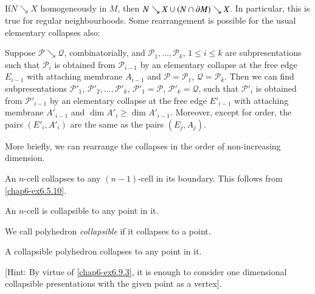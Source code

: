 \subsection{}\label{chap6-sec6.9.2}
If\pageoriginale $N\searrow X$ homogeneously in $M$, then $N\searrow X\cup (N\cap \partial M)\searrow X$. In particular, this is true for regular neighbourhoods. Some rearrangement is possible for the usual elementary collapses also:

\setcounter{proposition}{2}
\begin{ex}\label{chap6-ex6.9.3}
Suppose $\mathscr{P}\searrow \mathcal{Q}$, combinatorially, and $\mathscr{P}_{1},\ldots,\mathscr{P}_{k}$, $1\leq i\leq k$ are subpresentations such that $\mathscr{P}_{i}$ is obtained from $\mathscr{P}_{i-1}$ by an elementary collapse at the free edge $E_{i-1}$ with attaching membrane $A_{i-1}$ and $\mathscr{P}=\mathscr{P}_{1}$, $\mathcal{Q}=\mathscr{P}_{k}$. Then we can find subpresentations $\mathscr{P}'_{1}$, $\mathscr{P}'_{2},\ldots,\mathscr{P}'_{k}$, $\mathscr{P}'_{1}=\mathscr{P}$, $\mathscr{P}'_{k}=\mathcal{Q}$, such that $\mathscr{P}'_{i}$ is obtained from $\mathscr{P}'_{i-1}$ by an elementary collapse at the free edge $E'_{i-1}$ with attaching membrane $A'_{i-1}$ and $\dim A'_{i}\geq \dim A'_{i-1}$. Moreover, except for order, the pairs $(E'_{i},A'_{i})$ are the same as the pairs $(E_{j},A_{j})$.

More briefly, we can rearrange the collapses in the order of non-increasing dimension.
\end{ex}

\begin{ex}\label{chap6-ex6.9.4}
An $n$-cell collapses to any $(n-1)$-cell in its boundary. This follows from \ref{chap6-ex6.5.10}.
\end{ex}

\begin{ex}\label{chap6-ex6.9.5}
An $n$-cell is collapsible to any point in it.
\end{ex}

We call polyhedron {\em collapsible} if it collapses to a point.

\setcounter{proposition}{4}
\begin{dashex}\label{chap6-dashex6.9.5}
A collapsible polyhedron collapses to any point in it. 

[Hint: By virtue of \ref{chap6-ex6.9.3}, it is enough to consider one dimensional collapsible presentations with the given point as a vertex].
\end{dashex}

